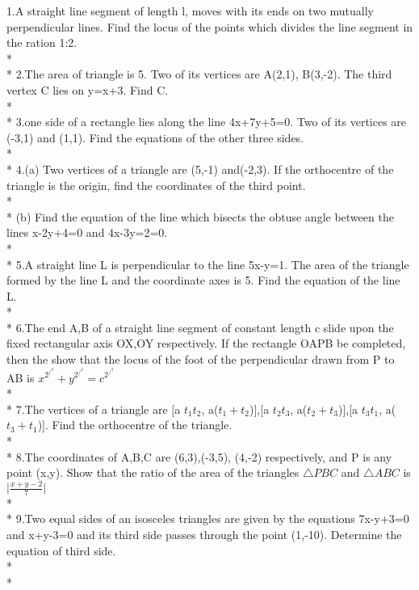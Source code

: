 \documentclass{article}
\begin{document}
{\large 1.\enspace A straight line segment of length l, moves with its ends on two mutually perpendicular lines. Find the locus of the points which divides the line segment in the ration 1:2.\\*\\*
2.\enspace The area of triangle is 5. Two of its vertices are A(2,1), B(3,-2). The third vertex C lies on y=x+3. Find C.\\*\\*
3.\enspace one side of a rectangle lies along the line 4x+7y+5=0. Two of its vertices are (-3,1) and (1,1). Find the equations of the other three sides.\\*\\*
4.\enspace (a) Two vertices of a triangle are (5,-1) and(-2,3). If the orthocentre of the triangle is the origin, find the coordinates of the third point.\\*\\*
\enspace\enspace (b) Find the equation of the line which bisects the obtuse angle between the lines x-2y+4=0 and 4x-3y=2=0.\\*\\*
5.\enspace A straight line L is perpendicular to the line 5x-y=1. The area of the triangle formed by the line L and the coordinate axes is 5. Find the equation of the line L.\\*\\*
6.\enspace The end A,B of a straight line segment of constant length c slide upon the fixed rectangular axis OX,OY respectively. If the rectangle OAPB be completed, then the show that the locus of the foot of the perpendicular drawn from P to AB is $x^2^/^3+y^2^/^3=c^2^/^3$\\*\\*
7.\enspace The vertices of a triangle are [a $t_1t_2$, a($t_1+t_2$)],[a $t_2t_3$, a($t_2+t_3$)],[a $t_3t_1$, a($t_3+t_1$)]. Find the orthocentre of the triangle.\\*\\*
8.\enspace The coordinates of A,B,C are (6,3),(-3,5), (4,-2) respectively, and P is any point (x,y). Show that the ratio of the area of the triangles $\triangle PBC$ and $\triangle ABC$ is $\vert {\frac{x+y-2}{7}}\vert$\\*\\*
9.\enspace Two equal sides of an isosceles triangles are given by the equations 7x-y+3=0 and x+y-3=0 and its third side passes through the point (1,-10). Determine the equation of third side.\\*\\*
}
\end{document}
